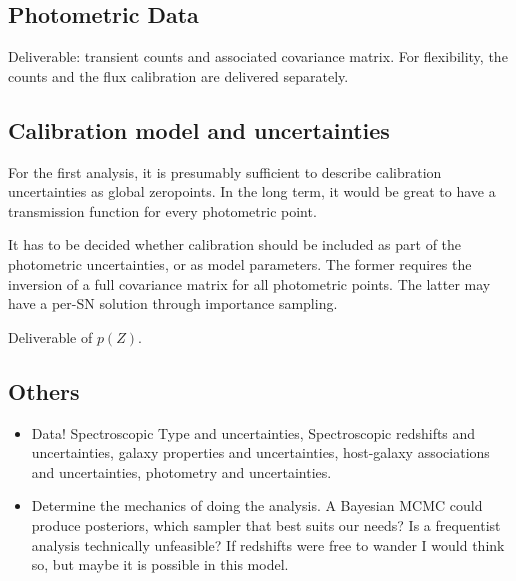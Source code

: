 \documentclass[preprint,3p]{elsarticle}
\begin{document}
\subsection{Photometric Data}

Deliverable:
transient counts and associated covariance matrix.  For flexibility, the counts and the
flux calibration are delivered separately.

\subsection{Calibration model and uncertainties}
For the first analysis, it is presumably sufficient to describe calibration uncertainties
as global zeropoints.  In the long term, it would be great to have a transmission
function for every photometric point.

It has to be decided whether calibration should be included
as part of the photometric uncertainties, or as model parameters.
The former requires the inversion of a full covariance matrix for all photometric
points.  The latter may have a per-SN solution through importance sampling.

Deliverable of $p(Z)$.

\subsection{Others}

\begin{itemize}
\item Data! Spectroscopic Type and uncertainties, Spectroscopic redshifts and
uncertainties, galaxy properties and uncertainties, host-galaxy associations
and uncertainties, photometry and uncertainties.
\item Determine the mechanics of doing the analysis.  A Bayesian MCMC could produce posteriors, which sampler that best suits our needs? Is a frequentist
analysis technically unfeasible? If redshifts were free to wander I would think so, but maybe
it is possible in this model.
\end{itemize}
\end{document}

